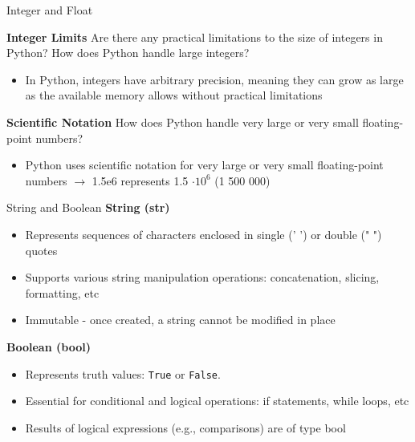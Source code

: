 \documentclass[
	11pt, 
]{beamer}
\begin{document}
\begin{frame}[fragile]{Integer and Float}

\begin{block}{\textbf{Integer Limits}}
 Are there any practical limitations to the size of integers in Python? How does Python handle large integers?
\end{block}
\pause
\begin{itemize}
    \item In Python, integers have arbitrary precision, meaning they can grow as large as the available memory allows without practical limitations
\end{itemize}

\begin{block}{\textbf{Scientific Notation}}
 How does Python handle very large or very small floating-point numbers?
\end{block}
\pause
\begin{itemize}
    \item Python uses scientific notation for very large or very small floating-point numbers $\rightarrow$ 1.5e6 represents 1.5 $ \cdot 10^{6}$ (1 500 000)
\end{itemize}


\end{frame}


\begin{frame}{String and Boolean}
\textbf{String (str)}
    \begin{itemize}
        \item Represents sequences of characters enclosed in single (' ') or double (" ") quotes 
        \item Supports various string manipulation operations: concatenation, slicing, formatting, etc
        \item Immutable - once created, a string cannot be modified in place
    \end{itemize}


\textbf{Boolean (bool)}
    \begin{itemize}
        \item Represents truth values: \texttt{True} or \texttt{False}.
        \item Essential for conditional and logical operations: if statements, while loops, etc
        \item Results of logical expressions (e.g., comparisons) are of type bool
    \end{itemize}

\end{frame}
\end{document}
